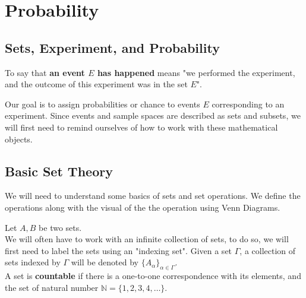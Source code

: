 \chapter[Probability]{Probability}
\section{Sets, Experiment, and Probability}





To say that \textbf{an event $E$ has happened} means "we performed the experiment, and the outcome of this experiment was in the set $E$". 











 




 


Our goal is to assign probabilities or chance to events $E$ corresponding to an experiment. Since events and sample spaces are described as sets and subsets, we will first need to remind ourselves of how to work with these mathematical objects.  

\section[Set Theory]{Basic Set Theory}
We will need to understand some basics of sets and set operations. We define the operations along with the visual of the the operation using Venn Diagrams.



Let $A,B$ be two sets.\\






















We will often have to work with an infinite collection of sets, to do so, we will first need to label the sets using an "indexing set". Given a set $\Gamma$, a collection of sets indexed by $\Gamma$ will be denoted by $\{A_\alpha\}_{\alpha\in \Gamma}$. 
\\
A set is \textbf{countable} if there is a one-to-one correspondence with its elements, and the set of natural number $\mathbb{N}= \{1, 2, 3, 4, \dots\}$. 
\\

